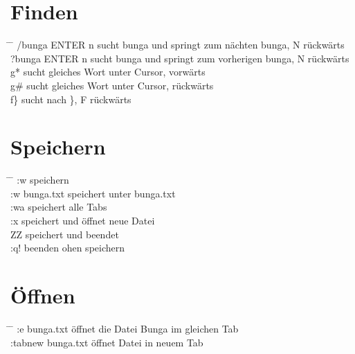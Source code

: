 \documentclass[a4paper,11pt,twoside]{article}
\begin{document}
\section*{Finden}
\begin{tabbing}
  \hspace{3mm} \= \hspace{40mm} \= \kill
  \> /bunga ENTER n \> sucht bunga und springt zum nächten bunga, N rückwärts \\ 
  \> ?bunga ENTER n \> sucht bunga und springt zum vorherigen bunga, N rückwärts \\
  \> g* \> sucht gleiches Wort unter Cursor, vorwärts \\
  \> g\# \> sucht gleiches Wort unter Cursor, rückwärts \\ 
  \> f\} \> sucht nach \}, F rückwärts \\
\end{tabbing}

\section*{Speichern}
\begin{tabbing}
  \hspace{3mm} \= \hspace{40mm} \= \kill
 \> :w \> speichern \\ 
 \> :w bunga.txt \> speichert unter bunga.txt \\ 
 \> :wa \> speichert alle Tabs \\ 
 \> :x \> speichert und öffnet neue Datei \\ 
 \> ZZ \> speichert und beendet \\ 
 \> :q! \> beenden ohen speichern \\ 
\end{tabbing}

\section*{Öffnen}
\begin{tabbing}
  \hspace{3mm} \= \hspace{40mm} \= \kill
 \> :e bunga.txt \> öffnet die Datei Bunga im gleichen Tab \\ 
 \> :tabnew bunga.txt \> öffnet Datei in neuem Tab \\
\end{tabbing}
\end{document}
